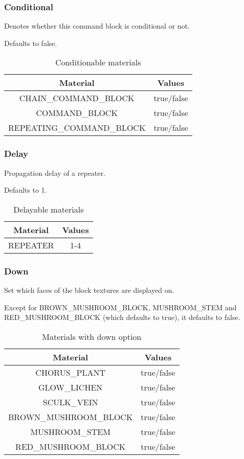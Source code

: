 \subsubsection{Conditional}\label{spigot-types:conditional}
Denotes whether this command block is conditional or not.

Defaults to false.

\begin{table}[H]
	\centering
	\begin{tabular}{ |c|c| }
		\hline
		Material & Values \\
		\hline
		CHAIN\_COMMAND\_BLOCK & true/false \\
		COMMAND\_BLOCK & true/false \\
		REPEATING\_COMMAND\_BLOCK & true/false \\
		\hline
	\end{tabular}
	\caption{Conditionable materials}
\end{table}

\subsubsection{Delay}\label{spigot-types:delay}
Propagation delay of a repeater.

Defaults to 1.

\begin{table}[H]
	\centering
	\begin{tabular}{ |c|c| }
		\hline
		Material & Values \\
		\hline
		REPEATER & 1-4 \\
		\hline
	\end{tabular}
	\caption{Delayable materials}
\end{table}

\subsubsection{Down}
Set which faces of the block textures are displayed on.

Except for BROWN\_MUSHROOM\_BLOCK, MUSHROOM\_STEM and RED\_MUSHROOM\_BLOCK (which defaults to true), it defaults to false.


\begin{table}[H]
	\centering
	\begin{tabular}{ |c|c| }
		\hline
		Material & Values \\
		\hline
		CHORUS\_PLANT & true/false \\
		GLOW\_LICHEN & true/false \\
		SCULK\_VEIN & true/false \\
		BROWN\_MUSHROOM\_BLOCK & true/false \\
		MUSHROOM\_STEM & true/false \\
		RED\_MUSHROOM\_BLOCK & true/false \\
		\hline
	\end{tabular}
	\caption{Materials with down option}
\end{table}

